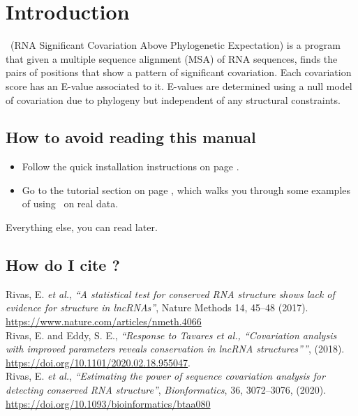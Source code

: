 \section{Introduction}
\setcounter{footnote}{0}

\rscape\ (RNA Significant Covariation Above Phylogenetic Expectation)
is a program that given a multiple sequence alignment (MSA) of RNA
sequences, finds the pairs of positions that show a pattern of
significant covariation. Each covariation score has an E-value
associated to it. E-values are determined using a null model of
covariation due to phylogeny but independent of any structural
constraints. 

\subsection{How to avoid reading this manual}

\begin{itemize}
\item Follow the quick installation instructions on page
      \pageref{section:installation}. 
\item Go to the tutorial section on page
\pageref{section:tutorial}, which walks you through some examples of
using \rscape\ on real data.
\end{itemize}

Everything else, you can read later.



\subsection{How do I cite \rscape?}

Rivas, E. \textit{et al.}, \textit{``A statistical test for conserved
  RNA structure shows lack of evidence for structure in lncRNAs''},
Nature Methods 14, 45–48 (2017).\\
\url{https://www.nature.com/articles/nmeth.4066}\\

\noindent
Rivas, E. and Eddy, S. E., \textit{``Response to Tavares et al.,
  “Covariation analysis with improved parameters reveals conservation
  in lncRNA structures”''}, (2018).\\
\url{https://doi.org/10.1101/2020.02.18.955047}.\\

\noindent
Rivas, E. \textit{et al.}, \textit{``Estimating the power of sequence
  covariation analysis for detecting conserved RNA structure''},
\textit{Bionformatics}, 36, 3072–3076, (2020).\\
\url{https://doi.org/10.1093/bioinformatics/btaa080}\\

